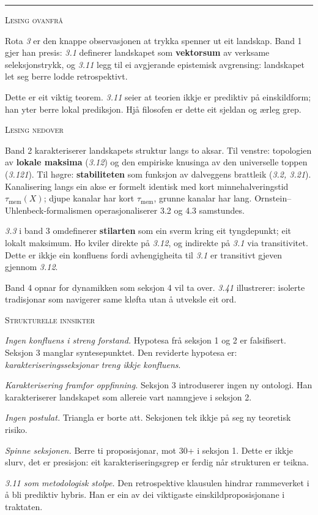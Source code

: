 \documentclass[a4paper,landscape,9pt]{article}
\begin{document}
\hrule

\vspace{0.4em}

\begin{minipage}[t]{0.325\textwidth}
{\scshape\small Lesing ovanfrå}

Rota \emph{3} er den knappe observasjonen at trykka spenner ut eit landskap. Band 1 gjer han presis: \emph{3.1} definerer landskapet som \textbf{vektorsum} av verksame seleksjonstrykk, og \emph{3.11} legg til ei avgjerande epistemisk avgrensing: landskapet let seg berre lodde retrospektivt.

Dette er eit viktig teorem. \emph{3.11} seier at teorien ikkje er prediktiv på einskildform; han yter berre lokal prediksjon. Hjå filosofen er dette eit sjeldan og ærleg grep.
\end{minipage}\hfill
\begin{minipage}[t]{0.325\textwidth}
{\scshape\small Lesing nedover}

Band 2 karakteriserer landskapets struktur langs to aksar. Til venstre: topologien av \textbf{lokale maksima} (\emph{3.12}) og den empiriske knusinga av den universelle toppen (\emph{3.121}). Til høgre: \textbf{stabiliteten} som funksjon av dalveggens brattleik (\emph{3.2, 3.21}). Kanalisering langs ein akse er formelt identisk med kort minnehalveringstid $\tau_{\mathrm{mem}}(X)$; djupe kanalar har kort $\tau_{\mathrm{mem}}$, grunne kanalar har lang. Ornstein--Uhlenbeck-formalismen operasjonaliserer 3.2 og 4.3 samstundes.

\emph{3.3} i band 3 omdefinerer \textbf{stilarten} som ein sverm kring eit tyngdepunkt; eit lokalt maksimum. Ho kviler direkte på \emph{3.12}, og indirekte på \emph{3.1} via transitivitet. Dette er ikkje ein konfluens fordi avhengigheita til \emph{3.1} er transitivt gjeven gjennom \emph{3.12}.

Band 4 opnar for dynamikken som seksjon 4 vil ta over. \emph{3.41} illustrerer: isolerte tradisjonar som navigerer same kløfta utan å utveksle eit ord.
\end{minipage}\hfill
\begin{minipage}[t]{0.325\textwidth}
{\scshape\small Strukturelle innsikter}

\emph{Ingen konfluens i streng forstand.} Hypotesa frå seksjon 1 og 2 er falsifisert. Seksjon 3 manglar syntesepunktet. Den reviderte hypotesa er: \emph{karakteriseringsseksjonar treng ikkje konfluens}.

\emph{Karakterisering framfor oppfinning.} Seksjon 3 introduserer ingen ny ontologi. Han karakteriserer landskapet som allereie vart namngjeve i seksjon 2.

\emph{Ingen postulat.} Triangla er borte att. Seksjonen tek ikkje på seg ny teoretisk risiko.

\emph{Spinne seksjonen.} Berre ti proposisjonar, mot 30+ i seksjon 1. Dette er ikkje slurv, det er presisjon: eit karakteriseringsgrep er ferdig når strukturen er teikna.

\emph{\emph{3.11} som metodologisk stolpe.} Den retrospektive klausulen hindrar rammeverket i å bli prediktiv hybris. Han er ein av dei viktigaste einskildproposisjonane i traktaten.
\end{minipage}
\end{document}
